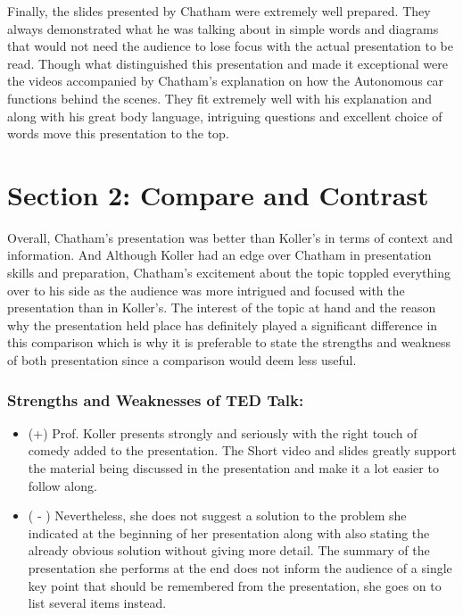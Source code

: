 \documentclass[12pt]{article}
\begin{document}
\vspace{2.5mm} %

    Finally, the slides presented by Chatham were extremely well prepared. They always demonstrated what he was talking about in simple words and diagrams that would not need the audience to lose focus with the actual presentation to be read. Though what distinguished this presentation and made it exceptional were the videos accompanied by Chatham's explanation on how the Autonomous car functions behind the scenes. They fit extremely well with his explanation and along with his great body language, intriguing questions and excellent choice of words move this presentation to the top.

\newpage

\section*{Section 2: Compare and Contrast}

    Overall, Chatham's presentation was better than Koller's in terms of context and information.  And Although Koller had an edge over Chatham in presentation skills and preparation, Chatham's excitement about the topic toppled everything over to his side as the audience was more intrigued and focused with the presentation than in Koller's. The interest of the topic at hand and the reason why the presentation held place has definitely played a significant difference in this comparison which is why it is preferable to state the strengths and weakness of both presentation since a comparison would deem less useful.
    
\subsubsection*{Strengths and Weaknesses of TED Talk:}

\begin{itemize}
\item (+) Prof. Koller presents strongly and seriously with the right touch of comedy added to the presentation. The Short video and slides greatly support the material being discussed in the presentation and make it a lot easier to follow along.
\item ( - ) Nevertheless, she does not suggest a  solution to the problem she indicated at the beginning of her presentation along with also stating the already obvious solution without giving more detail. The summary of the presentation she performs at the end does not inform the audience of a single key point that should be remembered from the presentation, she goes on to list several items instead.
\end{itemize}
\end{document}

